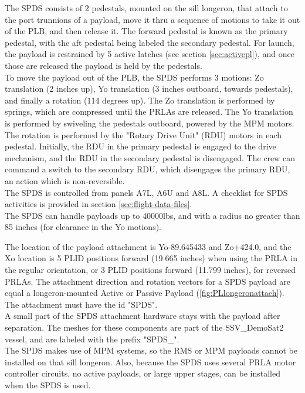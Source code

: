 \documentclass[Space_Shuttle_Vessel_Manual.tex]{subfiles}
\begin{document}
\begin{multicols*}{2}
The SPDS consists of 2 pedestals, mounted on the sill longeron, that attach to the port trunnions of a payload, move it thru a sequence of motions to take it out of the PLB, and then release it. The forward pedestal is known as the primary pedestal, with the aft pedestal being labeled the secondary pedestal. For launch, the payload is restrained by 5 active latches (see section \ref{sec:activepl}), and once those are released the payload is held by the pedestals.
\\
To move the payload out of the PLB, the SPDS performs 3 motions: Zo translation (2 inches up), Yo translation (3 inches outboard, towards pedestals), and finally a rotation (114 degrees up). The Zo translation is performed by springs, which are compressed until the PRLAs are released. The Yo translation is performed by swiveling the pedestals outboard, powered by the MPM motors. The rotation is performed by the "Rotary Drive Unit" (RDU) motors in each pedestal. Initially, the RDU in the primary pedestal is engaged to the drive mechanism, and the RDU in the secondary pedestal is disengaged. The crew can command a switch to the secondary RDU, which disengages the primary RDU, an action which is non-reversible.
\\
The SPDS is controlled from panels A7L, A6U and A8L. A checklist for SPDS activities is provided in section \ref{sec:flight-data-files}.
\\
The SPDS can handle payloads up to 40000lbs, and with a radius no greater than 85 inches (for clearance in the Yo motions). 

The location of the payload attachment is Yo-89.645433 and Zo+424.0, and the Xo location is 5 PLID positions forward (19.665 inches) when using the PRLA in the regular orientation, or 3 PLID positions forward (11.799 inches), for reversed PRLAs. The attachment direction and rotation vectors for a SPDS payload are equal a longeron-mounted Active or Passive Payload (\ref{fig:PLlongeronattach}). The attachment must have the id "SPDS".
\\
A small part of the SPDS attachment hardware stays with the payload after separation. The meshes for these components are part of the SSV\_DemoSat2 vessel, and are labeled with the prefix "SPDS\_".
\\
The SPDS makes use of MPM systems, so the RMS or MPM payloads cannot be installed on that sill longeron. Also, because the SPDS uses several PRLA motor controller circuits, no active payloads, or large upper stages, can be installed when the SPDS is used.



\end{multicols*}
\end{document}

